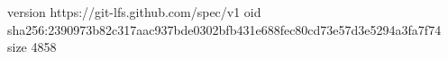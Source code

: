 version https://git-lfs.github.com/spec/v1
oid sha256:2390973b82c317aac937bde0302bfb431e688fec80cd73e57d3e5294a3fa7f74
size 4858
